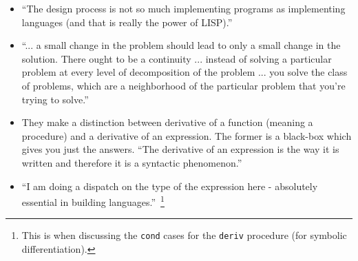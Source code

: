 \documentclass[12pt,a4paper]{article}
\newcommand\cc[1]{\texttt{#1}}
\begin{document}
\begin{itemize}
{  opposed to a strict hierarchy (see end of Lecture 3A).}.
\item ``The design process is not so much implementing programs as implementing
  languages (and that is really the power of LISP).''
\item ``... a small change in the problem should lead to only a small change in the
  solution. There ought to be a continuity ... instead of solving a particular problem
  at every level of decomposition of the problem ... you solve the class of problems,
  which are a neighborhood of the particular problem that you're trying to solve.''
\item They make a distinction between derivative of a function (meaning a procedure) and
  a derivative of an expression. The former is a black-box which gives you just the
  answers. ``The derivative of an expression is the way it is written and therefore it
  is a syntactic phenomenon.''
\item ``I am doing a dispatch on the type of the expression here - absolutely essential
  in building languages.''~\footnote{This is when discussing the \cc{cond} cases for the
  \cc{deriv} procedure (for symbolic differentiation).}
\end{itemize}

\nocite{*}


\end{document}
